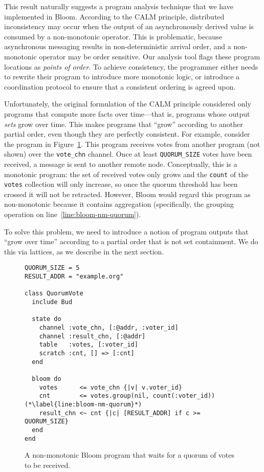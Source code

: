 This result naturally suggests a program analysis technique that we have
implemented in Bloom. According to the CALM principle, distributed inconsistency
may occur when the output of an asynchronously derived value is consumed by a
non-monotonic operator. This is problematic, because asynchronous messaging
results in non-deterministic arrival order, and a non-monotonic operator may be
order sensitive. Our analysis tool flags these program locations as \emph{points
  of order}. To achieve consistency, the programmer either needs to rewrite
their program to introduce more monotonic logic, or introduce a coordination
protocol to ensure that a consistent ordering is agreed upon.

Unfortunately, the original formulation of the CALM principle considered only
programs that compute more facts over time---that is, programs whose output
\emph{sets} grow over time. This makes programs that ``grow'' according to
another partial order, even though they are perfectly consistent. For example,
consider the program in Figure~\ref{fig:bloom-nm-quorum}. This program receives
votes from another program (not shown) over the \texttt{vote\_chn} channel. Once
at least \texttt{QUORUM\_SIZE} votes have been received, a message is sent to
another remote node. Conceptually, this is a monotonic program: the set of
received votes only grows and the \texttt{count} of the \texttt{votes}
collection will only increase, so once the quorum threshold has been crossed it
will not be retracted. However, Bloom would regard this program as non-monotonic
because it contains aggregation (specifically, the grouping operation on
line~\ref{line:bloom-nm-quorum}).

To solve this problem, we need to introduce a notion of program outputs that
``grow over time'' according to a partial order that is not set containment. We
do this via lattices, as we describe in the next section.

\begin{figure}[t]
\begin{scriptsize}
\begin{lstlisting}
QUORUM_SIZE = 5
RESULT_ADDR = "example.org"

class QuorumVote
  include Bud

  state do
    channel :vote_chn, [:@addr, :voter_id]
    channel :result_chn, [:@addr]
    table   :votes, [:voter_id]
    scratch :cnt, [] => [:cnt]
  end

  bloom do
    votes      <= vote_chn {|v| v.voter_id}
    cnt        <= votes.group(nil, count(:voter_id)) (*\label{line:bloom-nm-quorum}*)
    result_chn <~ cnt {|c| [RESULT_ADDR] if c >= QUORUM_SIZE}
  end
end
\end{lstlisting}
\end{scriptsize}
\caption{A non-monotonic Bloom program that waits for a quorum of votes to be received.}
\label{fig:bloom-nm-quorum}
\end{figure}
